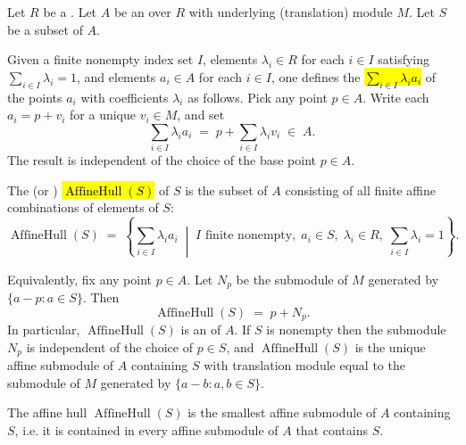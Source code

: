 \begin{definition} \label{definition:affine_hull_of_a_subset_of_an_affine_module_over_a_ring}
    Let $R$ be a . Let $A$ be an  over $R$ with underlying (translation) module $M$. Let $S$ be a subset of $A$.

    Given a finite nonempty index set $I$, elements $\lambda_i \in R$ for each $i \in I$ satisfying $\sum_{i \in I} \lambda_i = 1$, and elements $a_i \in A$ for each $i \in I$, one defines the  \hl{$\sum_{i \in I} \lambda_i a_i$} of the points $a_i$ with coefficients $\lambda_i$ as follows. Pick any point $p \in A$. Write each $a_i = p + v_i$ for a unique $v_i \in M$, and set
    $$\sum_{i \in I} \lambda_i a_i \;=\; p + \sum_{i \in I} \lambda_i v_i \;\in\; A.$$
    The result is independent of the choice of the base point $p \in A$.

    The  (or ) \hl{$\operatorname{AffineHull}(S)$} of $S$ is the subset of $A$ consisting of all finite affine combinations of elements of $S$:
    $$\operatorname{AffineHull}(S) \;=\; \left\{ \sum_{i \in I} \lambda_i a_i \;\middle|\; I \text{ finite nonempty},\; a_i \in S,\; \lambda_i \in R,\; \sum_{i \in I} \lambda_i = 1 \right\}.$$

    Equivalently, fix any point $p \in A$. Let $N_p$ be the submodule of $M$ generated by $\{a - p : a \in S\}$. Then
    $$\operatorname{AffineHull}(S) \;=\; p + N_p.$$
    In particular, $\operatorname{AffineHull}(S)$ is an  of $A$. If $S$ is nonempty then the submodule $N_p$ is independent of the choice of $p \in S$, and $\operatorname{AffineHull}(S)$ is the unique affine submodule of $A$ containing $S$ with translation module equal to the submodule of $M$ generated by $\{a - b : a, b \in S\}$.

    The affine hull $\operatorname{AffineHull}(S)$ is the smallest affine submodule of $A$ containing $S$, i.e. it is contained in every affine submodule of $A$ that contains $S$.
\end{definition}
